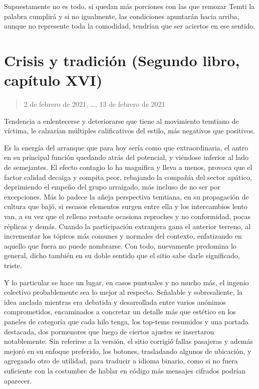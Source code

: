 \documentclass[
]{book}
\begin{document}
Supuestamente no es todo, si quedan más porciones con las que remozar Temti la palabra cumplirá y si no igualmente, las condiciones apuntarán hacia arriba, aunque no represente toda la comodidad, tendrían que ser aciertos en ese sentido.

\hypertarget{crisis-y-tradiciuxf3n-segundo-libro-capuxedtulo-xvi}{%
\section{Crisis y tradición (Segundo libro, capítulo XVI)}\label{crisis-y-tradiciuxf3n-segundo-libro-capuxedtulo-xvi}}

\begin{quote}
2 de febrero de 2021, \ldots, 13 de febrero de 2021
\end{quote}

Tendencia a enlentecerse y deteriorarse que tiene al movimiento temtiano de víctima, le calzarían múltiples calificativos del estilo, más negativos que positivos.

Es la energía del arranque que para hoy sería como que extraordinaria, el antro en su principal función quedando atrás del potencial, y viéndose inferior al lado de semejantes. El efecto contagio lo ha magnifica y lleva a menos, provoca que el factor calidad decaiga y compita peor, rebajando la compañía del sector apático, deprimiendo el empeño del grupo arraigado, más incluso de no ser por excepciones. Más lo padece la añeja perspectiva temtiana, en su propagación de cultura que bajó, si escasos elementos surgen entre ella y los intercambios lento van, a su vez que el relleno restante ocasiona reproches y no conformidad, pocas réplicas y demás. Cuando la participación extranjera gana el anterior terreno, al incrementar los tópicos más comunes y normales del contexto, enfatizando en aquello que fuera no puede nombrarse. Con todo, nuevamente predomina lo general, dicho también en su doble sentido que el sitio sabe darle significado, triste.

Y lo particular se hace un lugar, en casos puntuales y no mucho más, el ingenio colectivo probablemente sea lo mejor al respecto. Señalable y sobresaliente, la idea anclada mientras era debatida y desarrollada entre varios anónimos comprometidos, encaminados a concretar un detalle más que estético en los paneles de categoría que cada hilo tenga, los top-tems resumidos y una portada destacada, dos pormenores que luego de ciertos ajustes se insertaron notablemente. Sin referirse a la versión, el sitio corrigió fallas pasajeras y además mejoró en su enfoque preferido, los botones, trasladando algunos de ubicación, y agregando otro de utilidad, para traducir a idioma binario, como si no fuera suficiente con la costumbre de hablar en código más mensajes cifrados podrían aparecer.
\end{document}

